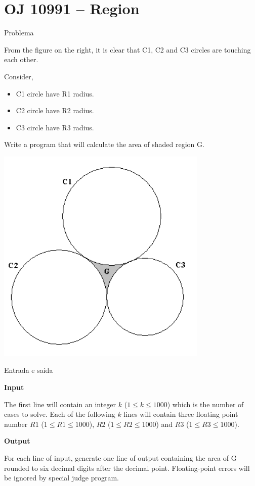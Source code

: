 \section{OJ 10991 -- Region}

\begin{frame}[fragile]{Problema}

\begin{minipage}{0.55\textwidth}
From the figure on the right, it is clear that C1,
C2 and C3 circles are touching each other.

Consider,
\begin{itemize}
\item C1 circle have R1 radius.
\item C2 circle have R2 radius.
\item C3 circle have R3 radius.
\end{itemize}

Write a program that will calculate the area
of shaded region G.
\end{minipage}
\begin{minipage}{0.4\textwidth}
\begin{center}
\includegraphics[scale=0.5]{figure.png}
\end{center}
\end{minipage}

\end{frame}

\begin{frame}[fragile]{Entrada e saída}

\textbf{Input}

The first line will contain an integer $k$ ($1 \leq k \leq 1000$) which is the number of cases to 
solve.  Each of the following $k$ lines will contain three floating point number 
$R1$ ($1 \leq R1 \leq 1000$), $R2$ ($1 \leq R2 \leq 1000$) and $R3$ ($1 \leq R3 \leq 1000$).

\textbf{Output}

For each line of input, generate one line of output containing the area of G rounded to six
decimal digits after the decimal point. Floating-point errors will be ignored by special judge program.

\end{frame}

